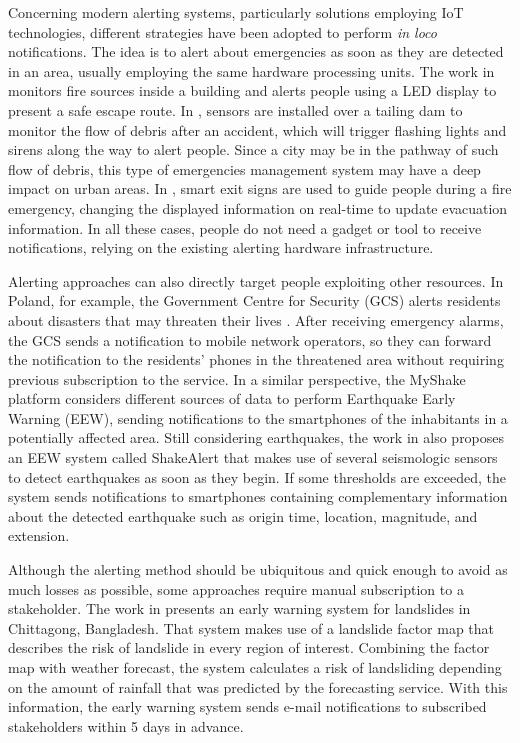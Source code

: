 \begin{refsection}
Concerning modern alerting systems, particularly solutions employing IoT technologies, different strategies have been adopted to perform \textit{in loco} notifications. The idea is to alert about emergencies as soon as they are detected in an area, usually employing the same hardware processing units. The work in \cite{iotFire3} monitors fire sources inside a building and alerts people using a LED display to present a safe escape route. In \cite{alertdam1}, sensors are installed over a tailing dam to monitor the flow of debris after an accident, which will trigger flashing lights and sirens along the way to alert people. Since a city may be in the pathway of such flow of debris, this type of emergencies management system may have a deep impact on urban areas. In \cite{iotFire5}, smart exit signs are used to guide people during a fire emergency, changing the displayed information on real-time to update evacuation information. In all these cases, people do not need a gadget or tool to receive notifications, relying on the existing alerting hardware infrastructure. 

Alerting approaches can also directly target people exploiting other resources. In Poland, for example, the Government Centre for Security (GCS) alerts residents about disasters that may threaten their lives \cite{notification2}. After receiving emergency alarms, the GCS sends a notification to mobile network operators, so they can forward the notification to the residents' phones in the threatened area without requiring previous subscription to the service. In a similar perspective, the MyShake platform \cite{iotEarthquake4} considers different sources of data to perform Earthquake Early Warning (EEW), sending notifications to the smartphones of the inhabitants in a potentially affected area. Still considering earthquakes, the work in \cite{notification1} also proposes an EEW system called ShakeAlert that makes use of several seismologic sensors to detect earthquakes as soon as they begin. If some thresholds are exceeded, the system sends notifications to smartphones containing complementary information about the detected earthquake such as origin time, location, magnitude, and extension. 

Although the alerting method should be ubiquitous and quick enough to avoid as much losses as possible, some approaches require manual subscription to a stakeholder. The work in \cite{notification3} presents an early warning system for landslides in Chittagong, Bangladesh. That system makes use of a landslide factor map that describes the risk of landslide in every region of interest. Combining the factor map with weather forecast, the system calculates a risk of landsliding depending on the amount of rainfall that was predicted by the forecasting service. With this information, the early warning system sends e-mail notifications to subscribed stakeholders within 5 days in advance.


\end{refsection}
